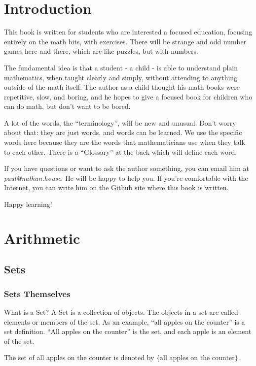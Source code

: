 \usepackage{amsfonts}

\chapter{Introduction}

This book is written for students who are interested a focused education, focusing entirely on the math bits,
with exercises.  There will be strange and odd number games here and there, which are like puzzles, but with numbers.

The fundamental idea is that a student - a child - is able to understand plain mathematics, when taught clearly and
simply, without  attending to anything outside of the math itself. The author as a child thought his math books were
repetitive, slow, and boring, and he hopes to give a focused book for children who can do math, but don't want to be bored.

A lot of the words, the ``terminology'', will be new and unusual.  Don't worry about that: they are just words, and words
can be learned.  We use the specific words here because they are the words that mathematicians use when they talk to
each other. There is a ``Glossary'' at the back which will define each word.

If you have questions or want to ask the author something, you can email him at \textit{paul@nathan.house}. He will be happy to help you.
If you're comfortable with the Internet, you can write him on the Github site where this book is written.

Happy learning!


\chapter{Arithmetic}

\section{Sets}
\subsection{Sets Themselves}
What is a Set?
A Set is a collection of objects.
The objects in a set are called elements or members of the set.
As an example, ``all apples on the counter'' is a set definition.
``All apples on the counter'' is the set, and each apple is an element of the set.

The set of all apples on the counter is denoted by $\{ \text{all apples on the counter} \}$.

